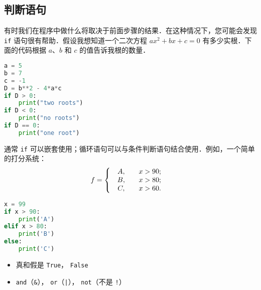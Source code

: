 

\subsection{判断语句}
有时我们在程序中做什么将取决于前面步骤的结果．在这种情况下，您可能会发现 \verb|if| 语句很有帮助．假设我想知道一个二次方程 $ax^2+bx+c=0$ 有多少实根．下面的代码根据 $a$、$b$ 和 $c$ 的值告诉我根的数量．
\begin{lstlisting}[language=python]
a = 5
b = 7
c = -1 
D = b**2 - 4*a*c
if D > 0:
    print("two roots")
if D < 0:
    print("no roots")
if D == 0:
    print("one root")
\end{lstlisting}

通常 \verb|if| 可以嵌套使用；循环语句可以与条件判断语句结合使用．例如，一个简单的打分系统：
\begin{equation}
f=\left\{\begin{array}{lc}\begin{array}{c}A, \\B, \\C, \end{array}&\begin{array}{c}x>90; \\x>80; \\x>60.\end{array}\end{array}\right.\\\\
\end{equation}
\begin{lstlisting}[language=python]
x = 99
if x > 90:
    print('A')
elif x > 80:
    print('B')
else:
    print('C')
\end{lstlisting}


\begin{itemize}
\item 真和假是 \verb|True|， \verb|False|
\item \verb|and|（\verb|&|）， \verb|or|（\verb`|`）， \verb|not|（不是 \verb|!|）
\end{itemize}


